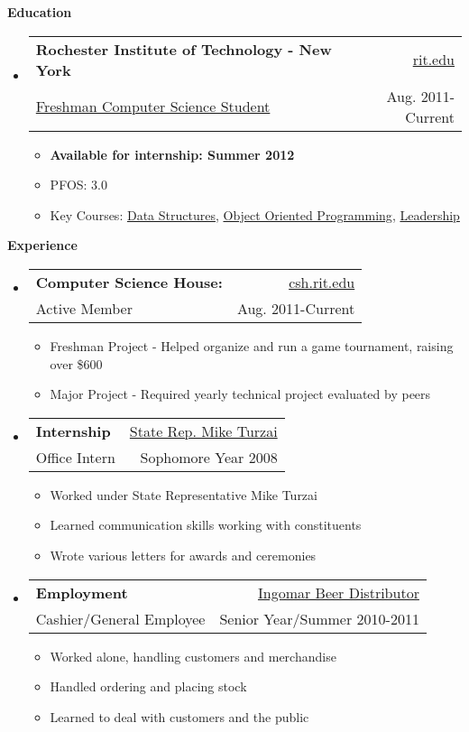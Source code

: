 \documentclass[letterpaper,11pt]{article}
\makeatletter
\newcommand{\resitem}[1]{\item #1 \vspace{-2pt}}
\newcommand{\resheading}[1]{{\large \colorbox{mygrey}{\begin{minipage}{\textwidth}{\textbf{#1 \vphantom{p\^{E}}}}\end{minipage}}}}
\newcommand{\ressubheading}[4]{
\begin{tabular*}{6.5in}{l@{\extracolsep{\fill}}r}
		\textbf{#1} & #2 \\
		{#3} & {#4} \\
\end{tabular*}\vspace{-6pt}}
\makeatother
\begin{document}
\resheading{Education}
	{ \footnotesize
	\begin{itemize}
		\item
			\ressubheading{Rochester Institute of Technology - New York}{\href{http://www.rit.edu/}{rit.edu}}{\href{http://www.cs.rit.edu/}{Freshman Computer Science Student}}{Aug. 2011-Current}
				{ \footnotesize
				\begin{itemize}
					\resitem{\textbf{Available for internship: Summer 2012}}
					\resitem{PFOS: 3.0}
					\resitem{Key Courses:  \href{https://register.rit.edu/courseSchedule/20112/40/03/242/05}{Data Structures}, 		
\href{https://register.rit.edu/courseSchedule/20113/40/03/243/03}{Object Oriented Programming}, 
\href{https://register.rit.edu/courseSchedule/20112/17/20/053/03}{Leadership}}
				\end{itemize}
				}
	\end{itemize} %
	}
\resheading{Experience}
{\footnotesize
	\begin{itemize}
		\item 
			\ressubheading{Computer Science House:}{\href{http://www.csh.rit.edu/}{csh.rit.edu}}{Active Member}{Aug. 2011-Current} 
			{ \footnotesize
				\begin{itemize}		
					\resitem{{Freshman Project} - Helped organize and run a game tournament, raising over \$600} 
					\resitem{{Major Project} - Required yearly technical project evaluated by peers}
				\end{itemize}
			}
		\item	
			\ressubheading{Internship}{\href{http://www.repturzai.com/}{State Rep. Mike Turzai}}{Office Intern}{Sophomore Year 2008} 
				{ \footnotesize 
				\begin{itemize}
					\item{Worked under State Representative Mike Turzai}
					\item{Learned communication skills working with constituents}
					\item{Wrote various letters for awards and ceremonies}
				\end{itemize}
				}
		\item 
			\ressubheading{Employment}{\href{https://www.facebook.com/pages/Ingomar-Beer-Distributor/120207034680524}{Ingomar Beer Distributor}}{Cashier/General Employee}{Senior Year/Summer 2010-2011}
			{ \footnotesize
				\begin{itemize}
					\item{Worked alone, handling customers and merchandise}
					\item{Handled ordering and placing stock}
					\item{Learned to deal with customers and the public}
				\end{itemize}
			}
		
	\end{itemize}  %
}
\end{document}
